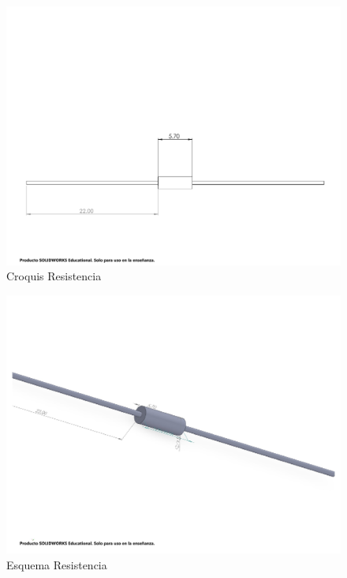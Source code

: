     \begin{figure}[H]
        \centering
        \includegraphics[trim = {10mm 10mm 10mm 10mm},clip,scale=0.2]{25/img/Croquis resistencia.pdf}
        \caption{Croquis Resistencia}
        \label{fig:lcd-16x2}
    \end{figure}
    \begin{figure}[H]
        \centering
        \includegraphics[trim = {10mm 10mm 10mm 10mm},clip,scale=0.2]{25/img/Resistencia.pdf}
        \caption{Esquema Resistencia}
        \label{fig:lcd-16x2}
    \end{figure}
